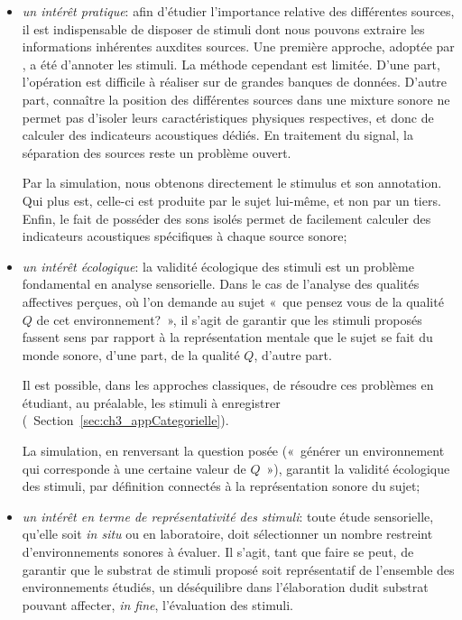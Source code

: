 \begin{itemize}
\item \emph{un intérêt pratique}: afin d'étudier l'importance relative des différentes sources, il est indispensable de disposer de stimuli dont nous pouvons extraire les informations inhérentes auxdites sources. Une première approche, adoptée par \citep{lavandier2006contribution}, a été d'annoter les stimuli. La méthode cependant est limitée. 
D'une part, l'opération est difficile à réaliser sur de grandes banques de données. D'autre part, connaître la position des différentes sources dans une mixture sonore ne permet pas d'isoler leurs caractéristiques physiques respectives, et donc de calculer des indicateurs acoustiques dédiés. En traitement du signal, la séparation des sources reste un problème ouvert\citep{vincent2014blind}.

Par la simulation, nous obtenons directement le stimulus et son annotation. Qui plus est, celle-ci est produite par le sujet lui-même, et non par un tiers. Enfin, le fait de posséder des sons isolés permet de facilement calculer des indicateurs acoustiques spécifiques à chaque source sonore;

\item \emph{un intérêt écologique}: la validité écologique des stimuli est un problème fondamental en analyse sensorielle. Dans le cas de l'analyse des qualités affectives perçues, où l'on demande au sujet «~que pensez vous de la qualité $Q$ de cet environnement?~», il s'agit de garantir que les stimuli proposés fassent sens par rapport à la représentation mentale que le sujet se fait du monde sonore, d'une part, de la qualité $Q$, d'autre part.

Il est possible, dans les approches classiques, de résoudre ces problèmes en étudiant, au préalable, les stimuli à enregistrer (\cf~Section~\ref{sec:ch3_appCategorielle}). 

La simulation, en renversant la question posée («~générer un environnement qui corresponde à une certaine valeur de $Q$~»), garantit la validité écologique des stimuli, par définition connectés à la représentation sonore du sujet;

\item \emph{un intérêt en terme de représentativité des stimuli}: toute étude sensorielle, qu'elle soit \emph{in situ} ou en laboratoire, doit sélectionner un nombre restreint d'environnements sonores à évaluer. Il s'agit, tant que faire se peut, de garantir que le substrat de stimuli proposé soit représentatif de l'ensemble des environnements étudiés, un déséquilibre dans l'élaboration dudit substrat pouvant affecter, \emph{in fine}, l'évaluation des stimuli. 


\end{itemize}
